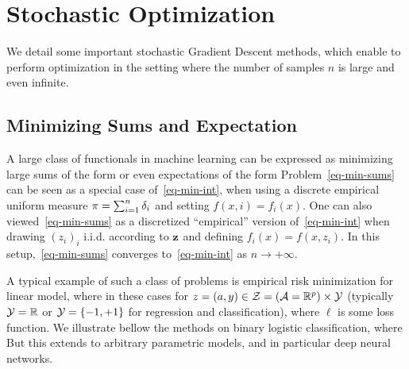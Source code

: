 
\section{Stochastic Optimization}
\label{sec-stochastic-optim}

We detail some important stochastic Gradient Descent methods, which enable to perform optimization in the setting where the number of samples $n$ is large and even infinite. 


\subsection{Minimizing Sums and Expectation}

A large class of functionals in machine learning can be expressed as minimizing large sums of the form
or even expectations of the form
Problem~\eqref{eq-min-sums} can be seen as a special case of~\eqref{eq-min-int}, when using a discrete empirical uniform measure $\pi = \sum_{i=1}^n \delta_i$ and setting $f(x,i)=f_i(x)$. One can also viewed~\eqref{eq-min-sums} as a discretized ``empirical'' version of~\eqref{eq-min-int} when drawing $(z_i)_i$ i.i.d. according to $\mathrm{\bf z}$ and defining $f_i(x)=f(x,z_i)$. In this setup,~\eqref{eq-min-sums} converges to~\eqref{eq-min-int} as $n \rightarrow +\infty$.

A typical example of such a class of problems is empirical risk minimization for linear model, where in these cases
for $z=(a,y) \in \mathcal{Z} = (\mathcal{A}=\mathbb{R}^p) \times \mathcal{Y}$ (typically $\mathcal{Y}=\mathbb{R}$ or $\mathcal{Y}=\{-1,+1\}$ for regression and classification), where $\ell$ is some loss function. 
%
We illustrate bellow the methods on binary logistic classification, where
But this extends to arbitrary parametric models, and in particular deep neural networks.

